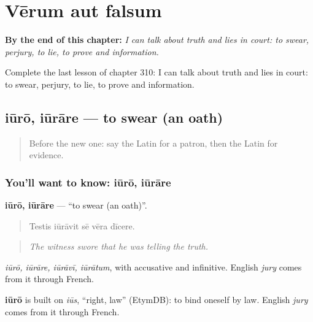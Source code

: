 
\chapter{Vērum aut falsum}
\label{ch:la-verum-aut-falsum}

\begin{chapteropening}
\textbf{By the end of this chapter:} \emph{I can talk about truth and lies in court: to swear, perjury, to lie, to prove and information.}

Complete the last lesson of chapter 310: I can talk about truth and lies in court: to swear, perjury, to lie, to prove and information.
\end{chapteropening}

\section[iūrō, iūrāre]{iūrō, iūrāre — to swear (an oath)}

\label{lesson:LA-C310-iuro}



\begin{quote}
Before the new one: say the Latin for a patron, then the Latin for evidence.
\end{quote}

\subsection*{You'll want to know: iūrō, iūrāre}
\textbf{iūrō, iūrāre} — \textquotedblleft{}to swear (an oath)\textquotedblright{}.

\begin{quote}
Testis iūrāvit sē vēra dīcere.
\end{quote}

\begin{quote}
\emph{The witness swore that he was telling the truth.}
\end{quote}

\emph{iūrō, iūrāre, iūrāvī, iūrātum}, with accusative and infinitive. English \emph{jury} comes from it through French.

\begin{cousinweb}
\textbf{iūrō} is built on \emph{iūs}, \textquotedblleft{}right, law\textquotedblright{} (EtymDB): to bind oneself by law. English \emph{jury} comes from it through French.
\end{cousinweb}

